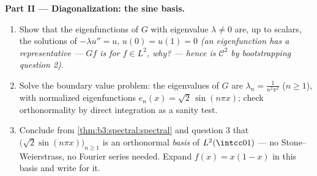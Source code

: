 \begin{problem}
\medskip
\noindent\textbf{Part II --- Diagonalization: the sine
basis.}
\begin{enumerate}[resume]
  \item Show that the eigenfunctions of $G$ with eigenvalue
        $\lambda \ne 0$ are, up to scalars, the solutions of
        $-\lambda u'' = u$, $u(0) = u(1) = 0$ \emph{(an
        eigenfunction has a  representative --- $Gf$
        is  for $f \in L^2$, why? --- hence is
        $\mathcal C^2$ by bootstrapping question 2)}.
  \item Solve the boundary value problem: the eigenvalues of
        $G$ are $\lambda_n = \frac1{n^2\pi^2}$ ($n \geq 1$),
        with normalized eigenfunctions $e_n(x) =
        \sqrt2\,\sin(n\pi x)$; check orthonormality by direct
        integration as a sanity test.
  \item Conclude from
        \cref{thm:b3:spectral:spectral} and question 3 that
        $\bigl(\sqrt2\sin(n\pi x)\bigr)_{n\geq1}$ is an
        orthonormal \emph{basis} of $L^2(\intcc01)$ --- no
        Stone--Weierstrass, no Fourier series needed. Expand
        $f(x) = x(1-x)$ in this basis and write  for
        it.
\end{enumerate}


\end{problem}
